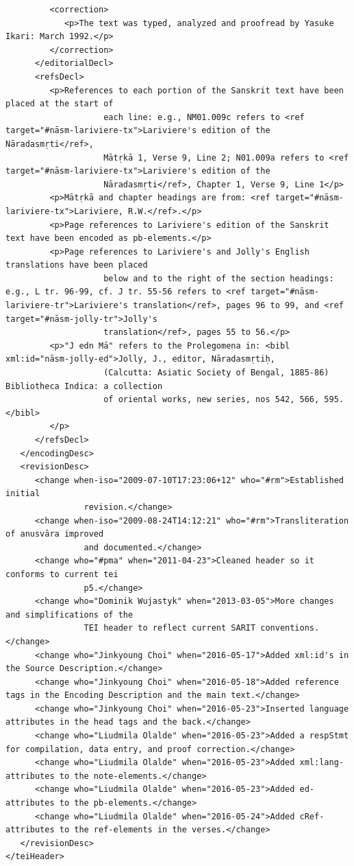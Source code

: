 \documentclass[article,12pt,a4paper]{memoir}%
\begin{document}
\begin{verbatim}
         <correction>
            <p>The text was typed, analyzed and proofread by Yasuke Ikari: March 1992.</p>
         </correction>
      </editorialDecl>
      <refsDecl>
         <p>References to each portion of the Sanskrit text have been placed at the start of
                    each line: e.g., NM01.009c refers to <ref target="#nāsm-lariviere-tx">Lariviere's edition of the Nāradasmṛti</ref>,
                    Mātṛkā 1, Verse 9, Line 2; N01.009a refers to <ref target="#nāsm-lariviere-tx">Lariviere's edition of the
                    Nāradasmṛti</ref>, Chapter 1, Verse 9, Line 1</p>
         <p>Mātṛkā and chapter headings are from: <ref target="#nāsm-lariviere-tx">Lariviere, R.W.</ref>.</p>
         <p>Page references to Lariviere's edition of the Sanskrit text have been encoded as pb-elements.</p>
         <p>Page references to Lariviere's and Jolly's English translations have been placed
                    below and to the right of the section headings: e.g., L tr. 96-99, cf. J tr. 55-56 refers to <ref target="#nāsm-lariviere-tr">Lariviere's translation</ref>, pages 96 to 99, and <ref target="#nāsm-jolly-tr">Jolly's
                    translation</ref>, pages 55 to 56.</p>
         <p>"J edn Mā" refers to the Prolegomena in: <bibl xml:id="nāsm-jolly-ed">Jolly, J., editor, Nāradasmṛtiḥ,
                    (Calcutta: Asiatic Society of Bengal, 1885-86) Bibliotheca Indica: a collection
                    of oriental works, new series, nos 542, 566, 595.</bibl>
         </p>
      </refsDecl>
   </encodingDesc>
   <revisionDesc>
      <change when-iso="2009-07-10T17:23:06+12" who="#rm">Established initial
                revision.</change>
      <change when-iso="2009-08-24T14:12:21" who="#rm">Transliteration of anusvāra improved
                and documented.</change>
      <change who="#pma" when="2011-04-23">Cleaned header so it conforms to current tei
                p5.</change>
      <change who="Dominik Wujastyk" when="2013-03-05">More changes and simplifications of the
                TEI header to reflect current SARIT conventions.</change>
      <change who="Jinkyoung Choi" when="2016-05-17">Added xml:id's in the Source Description.</change>
      <change who="Jinkyoung Choi" when="2016-05-18">Added reference tags in the Encoding Description and the main text.</change>
      <change who="Jinkyoung Choi" when="2016-05-23">Inserted language attributes in the head tags and the back.</change>
      <change who="Liudmila Olalde" when="2016-05-23">Added a respStmt for compilation, data entry, and proof correction.</change>
      <change who="Liudmila Olalde" when="2016-05-23">Added xml:lang-attributes to the note-elements.</change>
      <change who="Liudmila Olalde" when="2016-05-23">Added ed-attributes to the pb-elements.</change>
      <change who="Liudmila Olalde" when="2016-05-24">Added cRef-attributes to the ref-elements in the verses.</change>
   </revisionDesc>
</teiHeader>
	 \end{verbatim}
       
      \clearpage
      \begin{english}
      \printshorthands
      \printbibliography
      \end{english}
    
\end{document}
